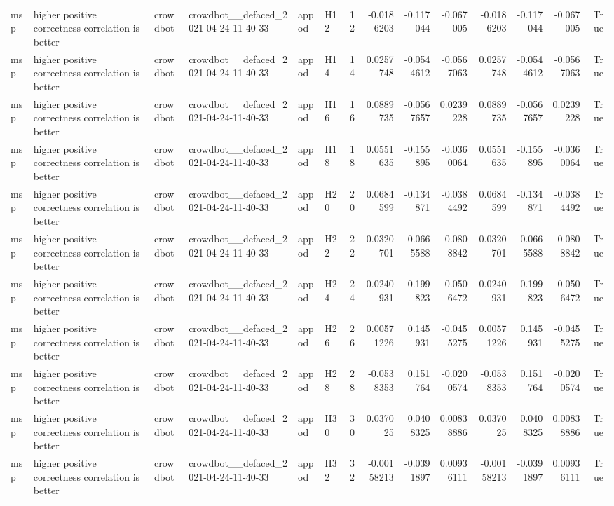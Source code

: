 \begin{longtable}{llllllrrrrrrrr}
msp & higher positive correctness correlation is better & crowdbot & crowdbot\_\_defaced\_2021-04-24-11-40-33 & appod & H12 & 12 & -0.0186203 & -0.117044 & -0.067005 & -0.0186203 & -0.117044 & -0.067005 & True \\
msp & higher positive correctness correlation is better & crowdbot & crowdbot\_\_defaced\_2021-04-24-11-40-33 & appod & H14 & 14 & 0.0257748 & -0.0544612 & -0.0567063 & 0.0257748 & -0.0544612 & -0.0567063 & True \\
msp & higher positive correctness correlation is better & crowdbot & crowdbot\_\_defaced\_2021-04-24-11-40-33 & appod & H16 & 16 & 0.0889735 & -0.0567657 & 0.0239228 & 0.0889735 & -0.0567657 & 0.0239228 & True \\
msp & higher positive correctness correlation is better & crowdbot & crowdbot\_\_defaced\_2021-04-24-11-40-33 & appod & H18 & 18 & 0.0551635 & -0.155895 & -0.0360064 & 0.0551635 & -0.155895 & -0.0360064 & True \\
msp & higher positive correctness correlation is better & crowdbot & crowdbot\_\_defaced\_2021-04-24-11-40-33 & appod & H20 & 20 & 0.0684599 & -0.134871 & -0.0384492 & 0.0684599 & -0.134871 & -0.0384492 & True \\
msp & higher positive correctness correlation is better & crowdbot & crowdbot\_\_defaced\_2021-04-24-11-40-33 & appod & H22 & 22 & 0.0320701 & -0.0665588 & -0.0808842 & 0.0320701 & -0.0665588 & -0.0808842 & True \\
msp & higher positive correctness correlation is better & crowdbot & crowdbot\_\_defaced\_2021-04-24-11-40-33 & appod & H24 & 24 & 0.0240931 & -0.199823 & -0.0506472 & 0.0240931 & -0.199823 & -0.0506472 & True \\
msp & higher positive correctness correlation is better & crowdbot & crowdbot\_\_defaced\_2021-04-24-11-40-33 & appod & H26 & 26 & 0.00571226 & 0.145931 & -0.0455275 & 0.00571226 & 0.145931 & -0.0455275 & True \\
msp & higher positive correctness correlation is better & crowdbot & crowdbot\_\_defaced\_2021-04-24-11-40-33 & appod & H28 & 28 & -0.0538353 & 0.151764 & -0.0200574 & -0.0538353 & 0.151764 & -0.0200574 & True \\
msp & higher positive correctness correlation is better & crowdbot & crowdbot\_\_defaced\_2021-04-24-11-40-33 & appod & H30 & 30 & 0.037025 & 0.0408325 & 0.00838886 & 0.037025 & 0.0408325 & 0.00838886 & True \\
msp & higher positive correctness correlation is better & crowdbot & crowdbot\_\_defaced\_2021-04-24-11-40-33 & appod & H32 & 32 & -0.00158213 & -0.0391897 & 0.00936111 & -0.00158213 & -0.0391897 & 0.00936111 & True \\

\end{longtable}
